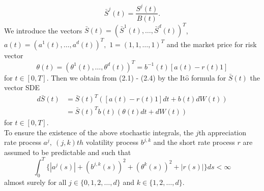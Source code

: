\documentclass[a4 paper, 12pt]{report}
\theoremstyle{plain}
\begin{document}
\begin{equation}\label{2.3}
\bar{S}^j(t) = \frac{S^j(t)}{B(t)}.
\end{equation}
We introduce the vectors $\bar{S}(t) = (\bar{S}^1(t),\ldots,\bar{S}^d(t))^T$, $a(t) = (a^1(t),\ldots,a^d(t))^T,$ $1 = (1,1,\ldots,1)^T$ and the market price for risk vector
\begin{equation}\label{2.4}
\theta(t) = (\theta^1(t),\ldots,\theta^d(t))^T = b^{-1}(t)[a(t) - r(t)1]
\end{equation}
for $t\in [0,T]$. Then we obtain from (2.1) - (2.4) by the It$\hat{\mbox{o}}$ formula for $\bar{S}(t)$ the vector SDE
\begin{align*}
d\bar{S}(t)& = \bar{S}(t)^T([a(t)-r(t)1]dt + b(t)dW(t))\\
& = \bar{S}(t)^Tb(t)(\theta(t)dt + dW(t))
\end{align*}
for $t\in [0,T]$.\\
To ensure the existence of the above stochastic integrals, the $j$th appreciation rate process $a^j, ~(j,k)th$ volatility process $b^{j,k}$ and the short rate process $r$ are assumed to be predictable and such that
\begin{equation}\label{2.5}
\int_0^T\bigg\{|a^j(s)|+(b^{j,k}(s))^2+(\theta^k(s))^2+|r(s)|\bigg\}ds<\infty
\end{equation}
almost surely for all $j\in\{0,1,2,\ldots,d\}$ and $k\in\{1,2,\ldots,d\}.$
\end{document}
